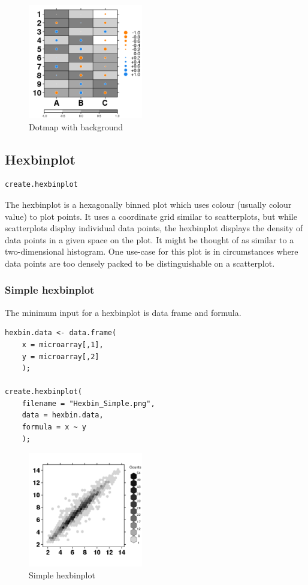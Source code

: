 \documentclass[letterpaper]{article}
\begin{document}
\begin{figure}[!ht]
  \begin{center}
     \includegraphics[width=50mm]{Figures/Dotmap_Background.png}
     \caption{Dotmap with background}
  \end{center}
\end{figure}

\subsection{Hexbinplot}
\begin{verbatim}
create.hexbinplot
\end{verbatim}

The hexbinplot is a hexagonally binned plot which uses colour (usually colour value) to plot points. It uses a coordinate grid similar to scatterplots, but while scatterplots display individual data points, the hexbinplot displays the density of data points in a given space on the plot. It might be thought of as similar to a two-dimensional histogram. One use-case for this plot is in circumstances where data points are too densely packed to be distinguishable on a scatterplot.

\subsubsection{Simple hexbinplot}
The minimum input for a hexbinplot is data frame and formula.
\begin{verbatim}
hexbin.data <- data.frame(
    x = microarray[,1],
    y = microarray[,2]
    );
    
create.hexbinplot(
    filename = "Hexbin_Simple.png",
    data = hexbin.data,
    formula = x ~ y
    );
\end{verbatim}

\begin{figure}[!ht]
  \begin{center}
     \includegraphics[width=50mm]{Figures/Hexbin_Simple.png}
     \caption{Simple hexbinplot}
  \end{center}
\end{figure}
\end{document}
